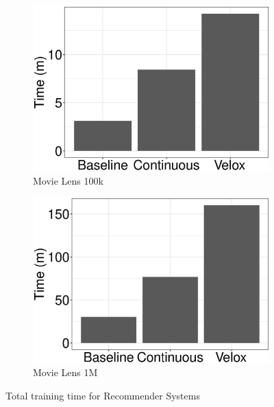 \documentclass{vldb}
\begin{document}
\begin{figure}[h]
	\centering
\begin{subfigure}[b]{0.5\columnwidth}
	\includegraphics[width=\linewidth, height=\linewidth,keepaspectratio]{../images/experiment-results/movie-lens-100k-times.eps}
	\caption{Movie Lens 100k}
	\label{fig:movie-lens-100k-times}
\end{subfigure}%
\begin{subfigure}[b]{0.5\columnwidth}
  	\includegraphics[width=\linewidth, height=\linewidth,keepaspectratio]{../images/experiment-results/movie-lens-1M-times.eps}
	\caption{Movie Lens 1M}
	\label{fig:movie-lens-1M}
\end{subfigure}
\caption{Total training time for Recommender Systems}
 \label{fig:movielens-running-time}
\end{figure}
\end{document}
